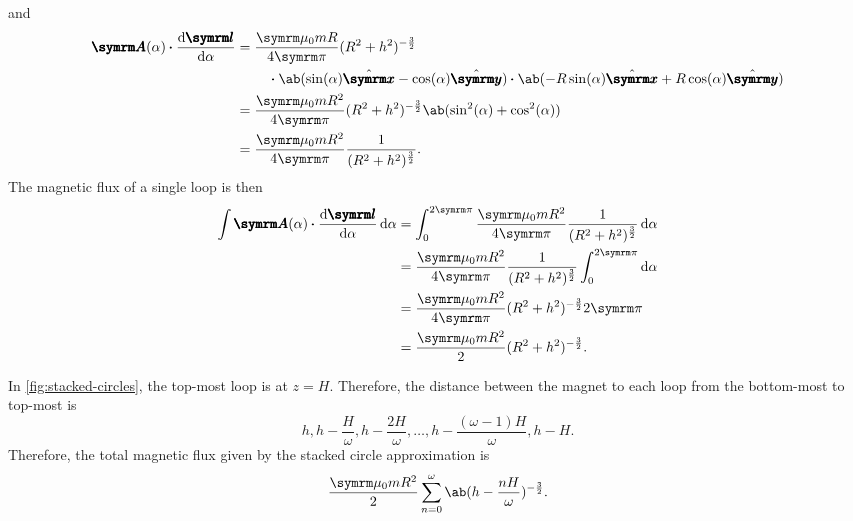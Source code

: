 and
\begin{align}
	\vv{A}(\alpha)\vdot\odv{\vv{l}}{\alpha} & = \begin{multlined}[t]
		                                            \frac{\bperm mR}{4\cpi}(R^2 + h^2)^{-\frac{3}{2}} \\
		                                            \vdot \ab(\sin(\alpha)\xhat - \cos(\alpha)\yhat) \vdot \ab(-R\sin(\alpha)\xhat + R\cos(\alpha)\yhat)
	                                            \end{multlined} \\
	                                        & = \frac{\bperm mR^2}{4\cpi}(R^2 + h^2)^{-\frac{3}{2}} \ab(\sin^2(\alpha) + \cos^2(\alpha))                                                        \\
	                                        & = \frac{\bperm mR^2}{4\cpi}\frac{1}{(R^2 + h^2)^{\frac{3}{2}}}.
\end{align}
The magnetic flux of a single loop is then
\begin{align}
	\int\vv{A}(\alpha)\vdot\odv{\vv{l}}{\alpha}\odif{\alpha} & = \int_{0}^{2\cpi}\frac{\bperm mR^2}{4\cpi}\frac{1}{(R^2 + h^2)^{\frac{3}{2}}}\odif{\alpha} \\
	                                                         & = \frac{\bperm mR^2}{4\cpi}\frac{1}{(R^2 + h^2)^{\frac{3}{2}}}\int_{0}^{2\cpi}\odif{\alpha} \\
	                                                         & = \frac{\bperm mR^2}{4\cpi}(R^2 + h^2)^{-\frac{3}{2}}2\cpi                                  \\
	                                                         & = \frac{\bperm mR^2}{2}(R^2 + h^2)^{-\frac{3}{2}}.
\end{align}

In \cref{fig:stacked-circles}, the top-most loop is at $z = H$. Therefore, the distance between the magnet to each loop from the bottom-most to top-most is
\begin{equation}
	h, h - \frac{H}{\omega}, h - \frac{2H}{\omega}, \dots, h - \frac{(\omega - 1)H}{\omega}, h - H.
\end{equation}
Therefore, the total magnetic flux given by the stacked circle approximation is
\begin{align}
	\frac{\bperm mR^2}{2}\sum_{n = 0}^{\omega}\ab(h - \frac{nH}{\omega})^{-\frac{3}{2}}.
\end{align}
